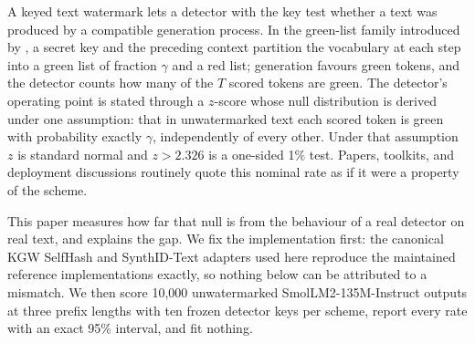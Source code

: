 \documentclass[conference]{IEEEtran}
\begin{document}
A keyed text watermark lets a detector with the key test whether a text was
produced by a compatible generation process. In the green-list family introduced
by \citet{kirchenbauer2023watermark}, a secret key and the preceding context
partition the vocabulary at each step into a green list of fraction $\gamma$ and a
red list; generation favours green tokens, and the detector counts how many of the
$T$ scored tokens are green. The detector's operating point is stated through a
$z$-score whose null distribution is derived under one assumption: that in
unwatermarked text each scored token is green with probability exactly $\gamma$,
independently of every other. Under that assumption $z$ is standard normal and
$z>2.326$ is a one-sided 1\% test. Papers, toolkits, and deployment discussions
routinely quote this nominal rate as if it were a property of the scheme.

This paper measures how far that null is from the behaviour of a real detector on
real text, and explains the gap. We fix the implementation first: the canonical
KGW SelfHash and SynthID-Text adapters used here reproduce the maintained
reference implementations exactly, so nothing below can be attributed to a
mismatch. We then score 10,000 unwatermarked SmolLM2-135M-Instruct outputs at
three prefix lengths with ten frozen detector keys per scheme, report every rate
with an exact 95\% interval, and fit nothing.
\end{document}
